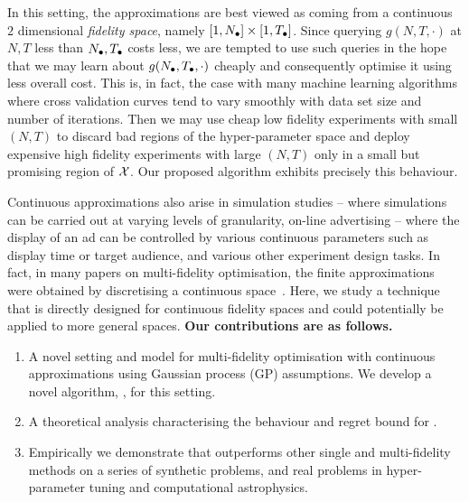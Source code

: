 In this setting, the approximations are best viewed as coming from a continuous $2$
dimensional \emph{fidelity space}, namely $[1, N_{{\bullet}}]\times[1,T_{{\bullet}}]$.
Since querying $g(N,T,\cdot)$ at $N,T$ less than $N_{{\bullet}},T_{{\bullet}}$ costs less, we are
tempted to use such queries in the hope that we may
learn about $g(N_{{\bullet}}, T_{{\bullet}},\cdot)$ cheaply and consequently
optimise it using less overall cost.
This is, in fact, the case with many machine learning algorithms where cross
validation curves tend to vary smoothly with data set size and number of iterations.
Then we may use cheap low fidelity experiments with small $(N, T)$ to discard bad regions
of the hyper-parameter space and deploy expensive high fidelity experiments with large
$(N,T)$ only in a small but promising region of $\mathcal{X}$.
Our proposed algorithm exhibits precisely this behaviour. 

Continuous approximations also arise in
simulation studies -- where simulations can be carried out at varying levels of granularity,
on-line advertising -- where the display of an ad can be controlled by various continuous
parameters such as display time or target audience, and various other
experiment design tasks.
In fact, in many papers on multi-fidelity optimisation, the finite approximations were
obtained by discretising
a continuous space~\citep{kandasamy16mfbo,huang06mfKriging}.
Here, we study a \bayo{} technique that is directly designed for continuous fidelity
spaces and could potentially be applied to more general spaces.
\textbf{Our contributions are as follows.}
\vspace{-0.09in}
\begin{enumerate}
\item A novel setting and model for multi-fidelity optimisation with continuous
approximations using Gaussian process (GP) assumptions.
We develop a novel algorithm, \boca, for this setting.
\vspace{-0.09in}
\item A theoretical analysis characterising the behaviour and regret bound for \boca.
\vspace{-0.09in}
\item Empirically we demonstrate that \bocas outperforms other single and multi-fidelity
  methods on a series of synthetic problems, and real problems in hyper-parameter tuning
  and computational astrophysics.
\end{enumerate}


